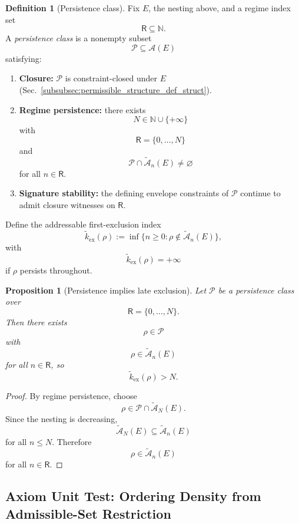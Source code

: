 \documentclass[aps,prx,onecolumn,11pt]{revtex4-2}
\theoremstyle{plain}
\newtheorem{proposition}{Proposition}
\theoremstyle{definition}
\newtheorem{definition}{Definition}
\theoremstyle{remark}
\begin{document}
\begin{definition}[Persistence class]
\label{def:persistence_class_struct}
Fix \(E\), the nesting above, and a regime index set
\[
\mathsf{R}\subseteq\mathbb{N}.
\]
A \emph{persistence class} is a nonempty subset
\[
\mathcal{P}\subseteq\mathcal{A}(E)
\]
satisfying:
\begin{enumerate}[label=(\roman*), leftmargin=2.2em]

\item \textbf{Closure:}
\(\mathcal{P}\) is constraint-closed under \(E\)
(Sec.~\ref{subsubsec:permissible_structure_def_struct}).

\item \textbf{Regime persistence:}
there exists
\[
N\in\mathbb{N}\cup\{+\infty\}
\]
with
\[
\mathsf{R}=\{0,\ldots,N\}
\]
and
\[
\mathcal{P}\cap\widetilde{\mathcal{A}}_n(E)\neq\varnothing
\]
for all \(n\in\mathsf{R}\).

\item \textbf{Signature stability:}
the defining envelope constraints of \(\mathcal{P}\) continue to admit
closure witnesses on \(\mathsf{R}\).

\end{enumerate}
\end{definition}

Define the addressable first-exclusion index
\[
\widetilde{k}_{\mathrm{ex}}(\rho)
:=
\inf
\{
n\geq 0:
\rho\notin\widetilde{\mathcal{A}}_n(E)
\},
\]
with
\[
\widetilde{k}_{\mathrm{ex}}(\rho)=+\infty
\]
if \(\rho\) persists throughout.

\begin{proposition}[Persistence implies late exclusion]
\label{prop:persistence_implies_late_exclusion}
Let \(\mathcal{P}\) be a persistence class over
\[
\mathsf{R}=\{0,\ldots,N\}.
\]
Then there exists
\[
\rho\in\mathcal{P}
\]
with
\[
\rho\in\widetilde{\mathcal{A}}_n(E)
\]
for all \(n\in\mathsf{R}\), so
\[
\widetilde{k}_{\mathrm{ex}}(\rho)>N.
\]
\end{proposition}

\begin{proof}
By regime persistence, choose
\[
\rho\in
\mathcal{P}\cap\widetilde{\mathcal{A}}_N(E).
\]
Since the nesting is decreasing,
\[
\widetilde{\mathcal{A}}_N(E)
\subseteq
\widetilde{\mathcal{A}}_n(E)
\]
for all \(n\leq N\). Therefore
\[
\rho\in\widetilde{\mathcal{A}}_n(E)
\]
for all \(n\in\mathsf{R}\).
\end{proof}

\subsection{Axiom Unit Test: Ordering Density from Admissible-Set Restriction}
\label{subsec:ordering_density_unit_test}
\end{document}
